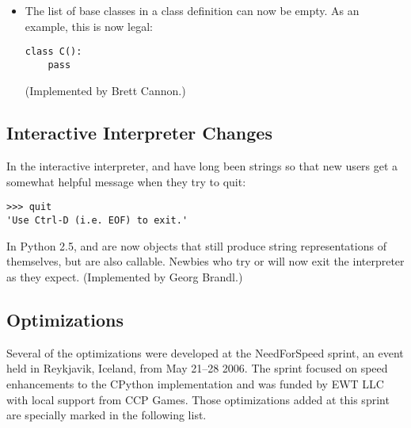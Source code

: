 \documentclass{howto}
\begin{document}
\begin{itemize}
\item The list of base classes in a class definition can now be empty.  
As an example, this is now legal:

\begin{verbatim}
class C():
    pass
\end{verbatim}
(Implemented by Brett Cannon.)

\end{itemize}


\subsection{Interactive Interpreter Changes\label{interactive}}

In the interactive interpreter,  and  
have long been strings so that new users get a somewhat helpful message
when they try to quit:

\begin{verbatim}
>>> quit
'Use Ctrl-D (i.e. EOF) to exit.'
\end{verbatim}

In Python 2.5,  and  are now objects that still
produce string representations of themselves, but are also callable.
Newbies who try  or  will now exit the
interpreter as they expect.  (Implemented by Georg Brandl.)


\subsection{Optimizations\label{opts}}

Several of the optimizations were developed at the NeedForSpeed
sprint, an event held in Reykjavik, Iceland, from May 21--28 2006.
The sprint focused on speed enhancements to the CPython implementation
and was funded by EWT LLC with local support from CCP Games.  Those
optimizations added at this sprint are specially marked in the
following list.
\end{document}
